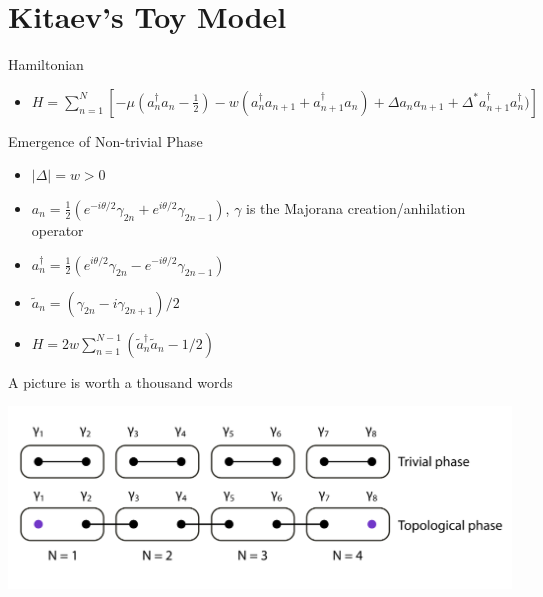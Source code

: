 \documentclass[presentation]{beamer}
\begin{document}
\section{Kitaev's Toy Model}
\label{sec:orgab5d7b8}
\begin{frame}[label={sec:orgbfee828}]{Hamiltonian \cite{kitaevUnpairedMajoranaFermions2001}}
\begin{itemize}
\item \(H = \sum_{n=1}^{N} [- \mu (a^{\dagger}_{n}a_{n}- \frac{1}{2}) - w
  (a^{\dagger}_{n}a_{n+1} + a^{\dagger}_{n+1}a_{n}) + \Delta a_{n}a_{n+1} +
  \Delta^{*}a^{\dagger}_{n+1}a^{\dagger}_{n})]\)
\end{itemize}
\end{frame}

\begin{frame}[label={sec:org94a9933}]{Emergence of Non-trivial Phase \cite{huangIntroductionMajoranaZero2021}}
\begin{itemize}
\item \(|\Delta| = w > 0\)
\item \(a_{n} = \frac{1}{2}(e^{-i \theta /2}\gamma_{2n} +
  e^{i\theta/2}\gamma_{2n-1})\), \(\gamma\) is the Majorana creation/anhilation operator
\item \(a^{\dagger}_{n} = \frac{1}{2}(e^{i\theta/2}\gamma_{2n} -
  e^{-i\theta/2}\gamma_{2n-1})\)
\item \(\tilde{a}_{n} = (\gamma_{2n}-i\gamma_{2n+1})/2\)
\item \(H = 2w \sum_{n=1}^{N-1}(\tilde{a}^{\dagger}_{n}\tilde{a}_{n} -1/2)\)
\end{itemize}
\end{frame}

\begin{frame}[label={sec:org0b8bdaa}]{A picture is worth a thousand words}
\begin{center}
\includegraphics[width=.9\linewidth]{./two-phases.png}
\end{center}
\end{frame}

\end{document}
